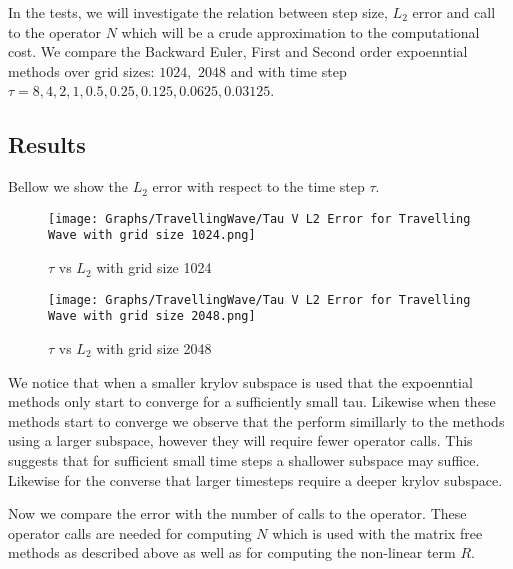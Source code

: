 In the tests, we will investigate the relation between step size, $L_2$ error and call to the operator $N$ which will be a crude approximation to the computational cost.
We compare the Backward Euler, First and Second order expoenntial methods over grid sizes: $1024,$ $2048$ and with time step $\tau=8,4,2,1,0.5,0.25,0.125,0.0625,0.03125$.

\subsection{Results}

Bellow we show the $L_2$ error with respect to the time step $\tau$.

\begin{figure}[H]
    \centering
    \begin{minipage}{0.49\textwidth}
        \texttt{[image: Graphs/TravellingWave/Tau V L2 Error for Travelling Wave with grid size 1024.png]} %
        \caption{$\tau$ vs $L_2$ with grid size 1024}
        \label{fig:plot1}
    \end{minipage}\hfill
    \centering
    \begin{minipage}{0.49\textwidth}
        \texttt{[image: Graphs/TravellingWave/Tau V L2 Error for Travelling Wave with grid size 2048.png]} %
        \caption{$\tau$ vs $L_2$ with grid size 2048}
        \label{fig:plot2}
    \end{minipage}\hfill
\end{figure}

We notice that when a smaller krylov subspace is used that the expoenntial methods only start to converge for a sufficiently small tau.
Likewise when these methods start to converge we observe that the perform simillarly to the methods using a larger subspace, however they will require fewer operator calls.
This suggests that for sufficient small time steps a shallower subspace may suffice.
Likewise for the converse that larger timesteps require a deeper krylov subspace.

Now we compare the error with the number of calls to the operator.
These operator calls are needed for computing $N$ which is used with the matrix free methods as described above as well as for computing the non-linear term $R$.

